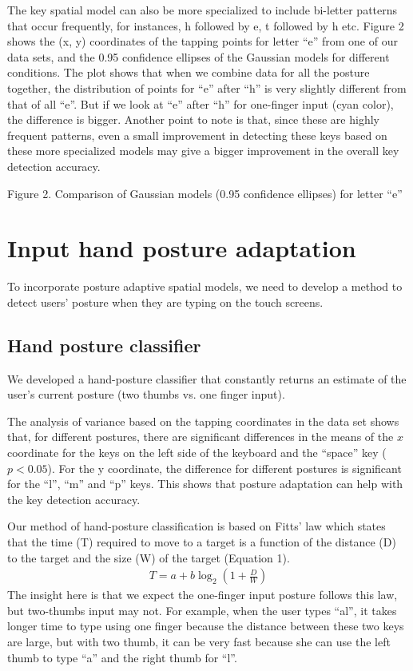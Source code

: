 \documentclass{sigchi}
\begin{document}
The key spatial model can also be more specialized to include bi-letter patterns
that occur frequently, for instances, h followed by e, t followed by h etc. 
Figure 2 shows the (x, y) coordinates of the tapping points for letter “e” from 
one of our data sets, and the 0.95 confidence ellipses of the Gaussian models 
for different conditions. The plot shows that when we combine data for all the 
posture together, the distribution of points for “e” after “h” is very slightly 
different from that of all “e”. But if we look at “e” after “h” for one-finger input (cyan color), the difference is bigger. Another point to note is that, since these are highly frequent patterns, even a small improvement in detecting these keys based on these more specialized models may give a bigger improvement in the overall key detection accuracy.


Figure 2. Comparison of Gaussian models (0.95 confidence ellipses) for letter “e”

\section{Input hand posture adaptation}
To incorporate posture adaptive spatial models, we need to develop a method to
detect users' posture when they are typing on the touch screens. 

\subsection{Hand posture classifier}

We developed a hand-posture classifier that constantly returns an estimate of the user’s current posture (two thumbs vs. one finger input).

The analysis of variance based on the tapping coordinates in the data set shows
that, for different postures, there are significant differences in the means of
the $x$ coordinate for the keys on the left side of the keyboard and the
``space'' key ($p < 0.05$). For the y coordinate, the difference for different
postures is significant for the “l”, “m” and “p” keys. This shows that posture adaptation can help with the key detection accuracy.

Our method of hand-posture classification is based on Fitts’ law which states that the time (T) required to move to a target is a function of the distance (D) to the target and the size (W) of the target (Equation 1).
\begin{align}
T = a + b\log_2(1 + \frac{D}{W})
\end{align}                                                  
The insight here is that we expect the one-finger input posture follows this law,  but two-thumbs input may not. For example, when the user types “al”, it takes longer time to type using one finger because the distance between these two keys are large, but with two thumb, it can be very fast because she can use the left thumb to type “a” and the right thumb for “l”.
\end{document}
